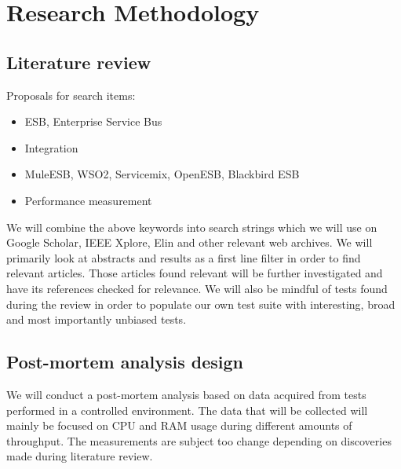 \documentclass[10pt,a4paper]{proposal}
\begin{document}
\section*{Research Methodology}

	\subsection{Literature review}
	Proposals for search items:
	\begin{itemize}
		\item ESB, Enterprise Service Bus
		\item Integration
		\item MuleESB, WSO2, Servicemix, OpenESB, Blackbird ESB
		\item Performance measurement
	\end{itemize}
	We will combine the above keywords into search strings which we will use on Google Scholar, IEEE Xplore, Elin and other relevant web archives.
	We will primarily look at abstracts and results as a first line filter in order to find relevant articles. Those articles found relevant will be further investigated and have its references checked for relevance.
	We will also be mindful of tests found during the review in order to populate our own test suite with interesting, broad and most importantly unbiased tests.

	\subsection{Post-mortem analysis design}
		We will conduct a post-mortem analysis based on data acquired from tests performed in a controlled environment. 
		The data that will be collected will mainly be focused on CPU and RAM usage during different amounts of throughput. 
		The measurements are subject too change depending on discoveries made during literature review.

\footnotesize


 
 
\end{document}
